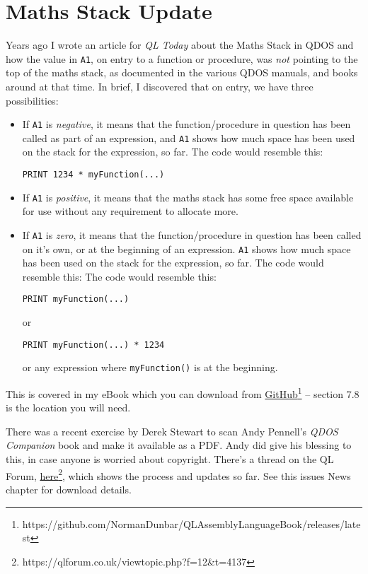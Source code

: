 
\chapter{Maths Stack Update}

Years ago I wrote an article for \emph{QL Today} about the Maths Stack
in QDOS and how the value in \texttt{A1}, on entry to a function or
procedure, was \emph{not} pointing to the top of the maths stack,
as documented in the various QDOS manuals, and books around at that
time. In brief, I discovered that on entry, we have three possibilities:
\begin{itemize}
\item If \texttt{A1} is \emph{negative}, it means that the function/procedure
in question has been called as part of an expression, and \texttt{A1}
shows how much space has been used on the stack for the expression,
so far. The code would resemble this: 
\begin{lstlisting}[basicstyle={\ttfamily},showstringspaces=false,tabsize=4]
PRINT 1234 * myFunction(...)
\end{lstlisting}
\item If \texttt{A1} is \emph{positive}, it means that the maths stack has
some free space available for use without any requirement to allocate
more. 
\item If \texttt{A1} is \emph{zero}, it means that the function/procedure
in question has been called on it's own, or at the beginning of an
expression. \texttt{A1} shows how much space has been used on the
stack for the expression, so far. The code would resemble this: The
code would resemble this: 
\begin{lstlisting}[basicstyle={\ttfamily},showstringspaces=false,tabsize=4]
PRINT myFunction(...)
\end{lstlisting}
 or 
\begin{lstlisting}[basicstyle={\ttfamily},showstringspaces=false,tabsize=4]
PRINT myFunction(...) * 1234
\end{lstlisting}
 or any expression where \lstinline[basicstyle={\ttfamily},showstringspaces=false,tabsize=4]!myFunction()!
is at the beginning.
\end{itemize}
This is covered in my eBook which you can download from \href{https://github.com/NormanDunbar/QLAssemblyLanguageBook/releases/latest}{GitHub}\footnote{https://github.com/NormanDunbar/QLAssemblyLanguageBook/releases/latest}
-- section 7.8 is the location you will need.

There was a recent exercise by Derek Stewart to scan Andy Pennell's
\emph{QDOS Companion} book and make it available as a PDF. Andy did
give his blessing to this, in case anyone is worried about copyright.
There's a thread on the QL Forum, \href{https://qlforum.co.uk/viewtopic.php?f=12&t=4137}{here}\footnote{https://qlforum.co.uk/viewtopic.php?f=12\&t=4137},
which shows the process and updates so far. See this issues News chapter
for download details.

